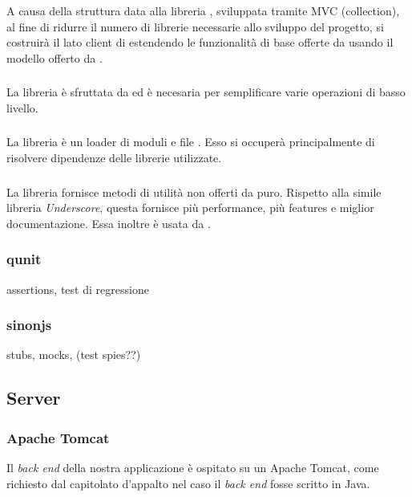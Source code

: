 A causa della struttura data alla libreria \jointjs{}, sviluppata tramite MVC (collection), al fine di ridurre il numero di librerie necessarie allo sviluppo del progetto, si costruirà il lato client di \proj{} estendendo le funzionalità di base offerte da \jointjs{} usando il modello \mvc{} offerto da \backbonejs{}.	

\subsubsection{\jquery}
La libreria \jquery{} è sfruttata da \jointjs{} ed è necesaria per semplificare varie operazioni di basso livello.

\subsubsection{\requirejs}
La libreria \requirejs{} è un loader di moduli e file \js{}. Esso si occuperà principalmente di risolvere dipendenze delle librerie \js{} utilizzate.

\subsubsection{\lodash}
La libreria \lodash{} fornisce metodi di utilità non offerti da \js{} puro. Rispetto alla simile libreria \emph{Underscore}, questa fornisce più performance, più features e miglior documentazione. Essa inoltre è usata da \jointjs{}.

\subsubsection{qunit}
assertions, test di regressione

\subsubsection{sinonjs}
stubs, mocks, (test spies??)



\subsection{Server}

\subsubsection{Apache Tomcat}
Il \emph{back end} della nostra applicazione è ospitato su un  Apache Tomcat, come richiesto dal capitolato d'appalto nel caso il \emph{back end} fosse scritto in Java.

